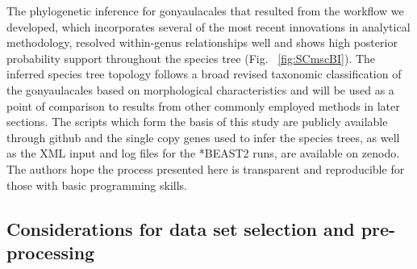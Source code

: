 \documentclass[fleqn,10pt,lineno]{wlpeerj} %
\begin{document}
The phylogenetic inference for gonyaulacales that resulted from the workflow we developed, which incorporates several of the most recent innovations in analytical methodology, resolved within-genus relationships well and shows high posterior probability support throughout the species tree (Fig. ~\ref{fig:SCmscBI}). 
The inferred species tree topology follows a broad revised taxonomic classification of the gonyaulacales based on morphological characteristics \citep{hoppenrath2017dinoflagellate} and will be used as a point of comparison to results from other commonly employed methods in later sections. 
The scripts which form the basis of this study are publicly available through github and the single copy genes used to infer the species trees, as well as the XML input and log files for the *BEAST2 runs, are available on zenodo. 
The authors hope the process presented here is transparent and reproducible for those with basic programming skills. 

\subsection*{Considerations for data set selection and pre-processing}
\end{document}

